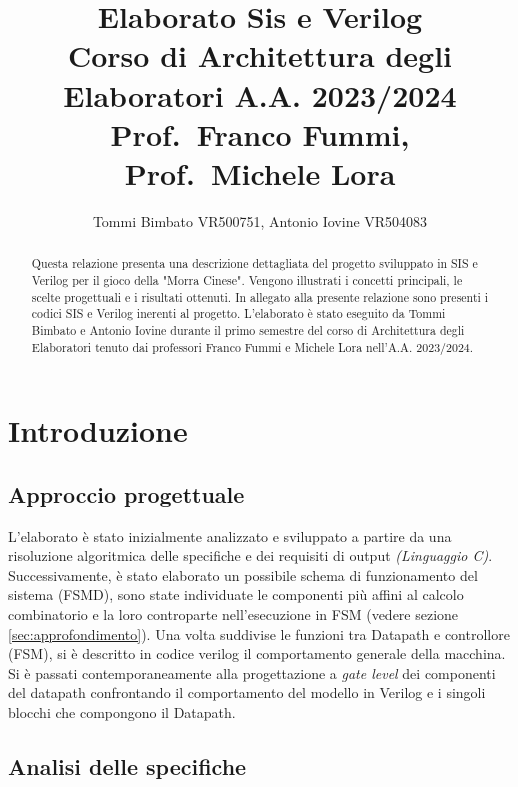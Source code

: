\documentclass[a4paper]{report}
\author{Tommi Bimbato VR500751, Antonio Iovine VR504083}
\title{Elaborato Sis e Verilog \\ \normalsize Corso di Architettura degli Elaboratori A.A. 2023/2024 \\ Prof.\ Franco Fummi, Prof.\ Michele Lora}
\begin{document}
\begin{titlepage}
    \maketitle
\end{titlepage}

\thispagestyle{empty} %

\tableofcontents %

\begin{abstract}
Questa relazione presenta una descrizione dettagliata del progetto sviluppato in SIS e Verilog per il gioco della "Morra Cinese". Vengono illustrati i concetti principali, le scelte progettuali e i risultati ottenuti.
In allegato alla presente relazione sono presenti i codici SIS e Verilog inerenti al progetto.
L'elaborato è stato eseguito da Tommi Bimbato e Antonio Iovine durante il primo semestre del corso di Architettura degli Elaboratori tenuto dai professori Franco Fummi e Michele Lora nell'A.A. 2023/2024.

\end{abstract}

\chapter{Introduzione}
\section{Approccio progettuale}
L'elaborato è stato inizialmente analizzato e sviluppato a partire da una risoluzione algoritmica delle specifiche e dei requisiti di output \textit{(Linguaggio C)}.
Successivamente, è stato elaborato un possibile schema di funzionamento del sistema (FSMD), sono state individuate le componenti più affini al calcolo combinatorio e la loro controparte nell'esecuzione in FSM (vedere sezione \ref{sec:approfondimento}).\@
Una volta suddivise le funzioni tra Datapath e controllore (FSM), si è descritto in codice verilog il comportamento generale della macchina.
Si è passati contemporaneamente alla progettazione a \textit{gate level} dei componenti del datapath confrontando il comportamento del modello in Verilog e i singoli blocchi che compongono il Datapath.\@

\section{Analisi delle specifiche}
\end{document}
